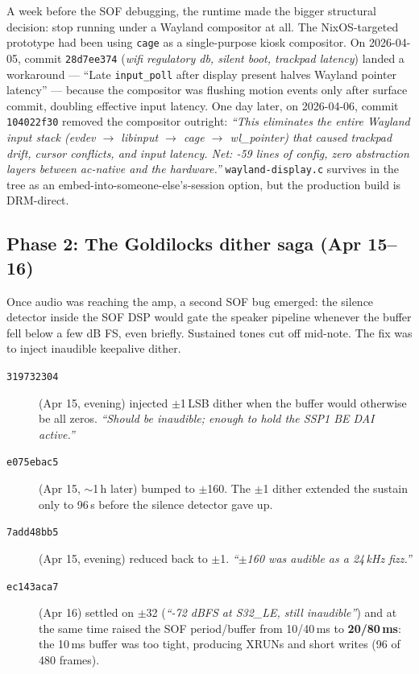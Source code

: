 \documentclass[10pt,letterpaper,twocolumn]{article}
\begin{document}
A week before the SOF debugging, the runtime made the bigger structural decision: stop running under a Wayland compositor at all. The NixOS-targeted prototype had been using \texttt{cage} as a single-purpose kiosk compositor. On 2026-04-05, commit \texttt{28d7ee374} (\emph{wifi regulatory db, silent boot, trackpad latency}) landed a workaround --- ``Late \texttt{input\_poll} after display present halves Wayland pointer latency'' --- because the compositor was flushing motion events only after surface commit, doubling effective input latency. One day later, on 2026-04-06, commit \texttt{104022f30} removed the compositor outright: \emph{``This eliminates the entire Wayland input stack (evdev $\rightarrow$ libinput $\rightarrow$ cage $\rightarrow$ wl\_pointer) that caused trackpad drift, cursor conflicts, and input latency. Net: -59 lines of config, zero abstraction layers between ac-native and the hardware.''} \texttt{wayland-display.c} survives in the tree as an embed-into-someone-else's-session option, but the production build is DRM-direct.

\subsection{Phase 2: The Goldilocks dither saga (Apr 15--16)}

Once audio was reaching the amp, a second SOF bug emerged: the silence detector inside the SOF DSP would gate the speaker pipeline whenever the buffer fell below a few dB FS, even briefly. Sustained tones cut off mid-note. The fix was to inject inaudible keepalive dither.

\begin{description}
  \item[\texttt{319732304}] (Apr 15, evening) injected $\pm$1\,LSB dither when the buffer would otherwise be all zeros. \emph{``Should be inaudible; enough to hold the SSP1 BE DAI active.''}
  \item[\texttt{e075ebac5}] (Apr 15, $\sim$1\,h later) bumped to $\pm$160. The $\pm$1 dither extended the sustain only to 96\,s before the silence detector gave up.
  \item[\texttt{7add48bb5}] (Apr 15, evening) reduced back to $\pm$1. \emph{``$\pm$160 was audible as a 24\,kHz fizz.''}
  \item[\texttt{ec143aca7}] (Apr 16) settled on $\pm$32 (\emph{``-72 dBFS at S32\_LE, still inaudible''}) and at the same time raised the SOF period/buffer from 10/40\,ms to \textbf{20/80\,ms}: the 10\,ms buffer was too tight, producing XRUNs and short writes (96 of 480 frames).
\end{description}
\end{document}
